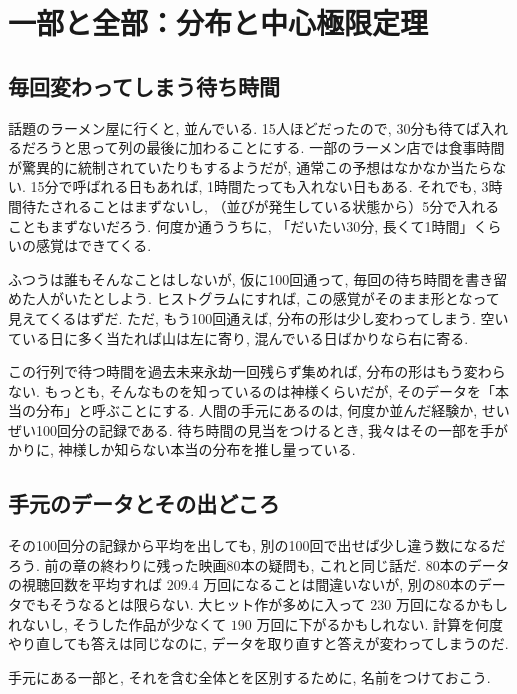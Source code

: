 \section{一部と全部：分布と中心極限定理}

  \subsection{毎回変わってしまう待ち時間}

    話題のラーメン屋に行くと, 並んでいる.
    15人ほどだったので, 30分も待てば入れるだろうと思って列の最後に加わることにする. 
    一部のラーメン店では食事時間が驚異的に統制されていたりもするようだが, 通常この予想はなかなか当たらない.
    15分で呼ばれる日もあれば, 1時間たっても入れない日もある.
    それでも, 3時間待たされることはまずないし, （並びが発生している状態から）5分で入れることもまずないだろう.
    何度か通ううちに, 「だいたい30分, 長くて1時間」くらいの感覚はできてくる.

    ふつうは誰もそんなことはしないが, 仮に100回通って, 毎回の待ち時間を書き留めた人がいたとしよう.
    ヒストグラムにすれば, この感覚がそのまま形となって見えてくるはずだ.
    ただ, もう100回通えば, 分布の形は少し変わってしまう.
    空いている日に多く当たれば山は左に寄り, 混んでいる日ばかりなら右に寄る.

    この行列で待つ時間を過去未来永劫一回残らず集めれば, 分布の形はもう変わらない.
    もっとも, そんなものを知っているのは神様くらいだが, そのデータを「本当の分布」と呼ぶことにする.
    人間の手元にあるのは, 何度か並んだ経験か, せいぜい100回分の記録である.
    待ち時間の見当をつけるとき, 我々はその一部を手がかりに, 神様しか知らない本当の分布を推し量っている.

  \subsection{手元のデータとその出どころ}

    その100回分の記録から平均を出しても, 別の100回で出せば少し違う数になるだろう.
    前の章の終わりに残った映画80本の疑問も, これと同じ話だ.
    80本のデータの視聴回数を平均すれば $209.4$ 万回になることは間違いないが, 別の80本のデータでもそうなるとは限らない.
    大ヒット作が多めに入って $230$ 万回になるかもしれないし, そうした作品が少なくて $190$ 万回に下がるかもしれない.
    計算を何度やり直しても答えは同じなのに, データを取り直すと答えが変わってしまうのだ.

    手元にある一部と, それを含む全体とを区別するために, 名前をつけておこう.

